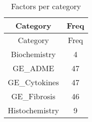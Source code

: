 \documentclass[]{article}
\begin{document}
\begin{longtable}[c]{@{}cc@{}}
\caption{Factors per category}\tabularnewline
\toprule
\begin{minipage}[b]{0.20\columnwidth}\centering\strut
Category
\strut\end{minipage} &
\begin{minipage}[b]{0.08\columnwidth}\centering\strut
Freq
\strut\end{minipage}\tabularnewline
\midrule
\endfirsthead
\toprule
\begin{minipage}[b]{0.20\columnwidth}\centering\strut
Category
\strut\end{minipage} &
\begin{minipage}[b]{0.08\columnwidth}\centering\strut
Freq
\strut\end{minipage}\tabularnewline
\midrule
\endhead
\begin{minipage}[t]{0.20\columnwidth}\centering\strut
Biochemistry
\strut\end{minipage} &
\begin{minipage}[t]{0.08\columnwidth}\centering\strut
4
\strut\end{minipage}\tabularnewline
\begin{minipage}[t]{0.20\columnwidth}\centering\strut
GE\_ADME
\strut\end{minipage} &
\begin{minipage}[t]{0.08\columnwidth}\centering\strut
47
\strut\end{minipage}\tabularnewline
\begin{minipage}[t]{0.20\columnwidth}\centering\strut
GE\_Cytokines
\strut\end{minipage} &
\begin{minipage}[t]{0.08\columnwidth}\centering\strut
47
\strut\end{minipage}\tabularnewline
\begin{minipage}[t]{0.20\columnwidth}\centering\strut
GE\_Fibrosis
\strut\end{minipage} &
\begin{minipage}[t]{0.08\columnwidth}\centering\strut
46
\strut\end{minipage}\tabularnewline
\begin{minipage}[t]{0.20\columnwidth}\centering\strut
Histochemistry
\strut\end{minipage} &
\begin{minipage}[t]{0.08\columnwidth}\centering\strut
9
\strut\end{minipage}\tabularnewline
\bottomrule
\end{longtable}
\end{document}
